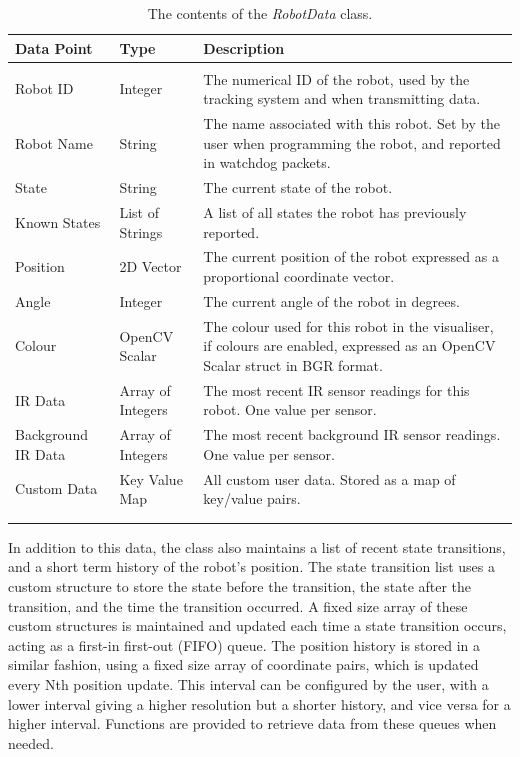 \begin{longtable}{ l l p{8cm} }
\caption[Robot Data Contents]{The contents of the \textit{RobotData} class.}\\
 \hline
 \textbf{Data Point} & \textbf{Type} & \textbf{Description}\\
 \hline\\
 Robot ID & Integer & The numerical ID of the robot, used by the tracking system and when transmitting data.\\
 Robot Name & String & The name associated with this robot. Set by the user when programming the robot, and reported in watchdog packets. \\
 State & String & The current state of the robot. \\
 Known States & List of Strings & A list of all states the robot has previously reported. \\
 Position & 2D Vector & The current position of the robot expressed as a proportional coordinate vector. \\
 Angle & Integer & The current angle of the robot in degrees. \\
 Colour & OpenCV Scalar & The colour used for this robot in the visualiser, if colours are enabled, expressed as an OpenCV Scalar struct in BGR format. \\
 IR Data & Array of Integers & The most recent IR sensor readings for this robot. One value per sensor. \\
 Background IR Data & Array of Integers & The most recent background IR sensor readings. One value per sensor. \\
 Custom Data & Key Value Map & All custom user data. Stored as a map of key/value pairs. \\
 \bottomrule\\
 \label{tab:RobotDataContents}
\end{longtable}

In addition to this data, the class also maintains a list of recent state transitions, and a short term history of the robot's position. The state transition list uses a custom structure to store the state before the transition, the state after the transition, and the time the transition occurred. A fixed size array of these custom structures is maintained and updated each time a state transition occurs, acting as a first-in first-out (FIFO) queue. The position history is stored in a similar fashion, using a fixed size array of coordinate pairs, which is updated every Nth position update. This interval can be configured by the user, with a lower interval giving a higher resolution but a shorter history, and vice versa for a higher interval. Functions are provided to retrieve data from these queues when needed.

